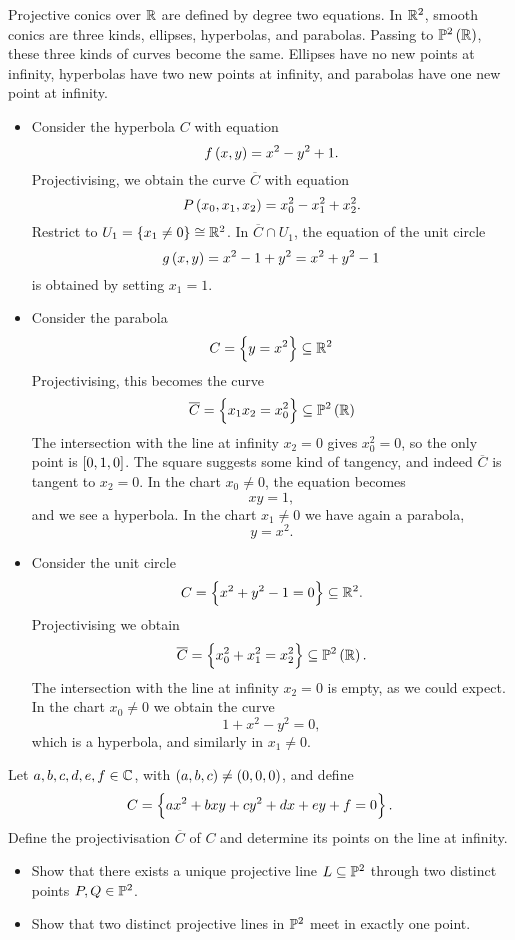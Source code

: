 \begin{example}
Projective conics over $ \mathbb{R} $ are defined by degree two equations. In $ \mathbb{R}^2 $, smooth conics are three kinds, ellipses, hyperbolas, and parabolas. Passing to $ \PP^2\br{\RR} $, these three kinds of curves become the same. Ellipses have no new points at infinity, hyperbolas have two new points at infinity, and parabolas have one new point at infinity.
\begin{itemize}
\item Consider the hyperbola $ C $ with equation
$$ f\br{x, y} = x^2 - y^2 + 1. $$
Projectivising, we obtain the curve $ \overline{C} $ with equation
$$ P\br{x_0, x_1, x_2} = x_0^2 - x_1^2 + x_2^2. $$
Restrict to $ U_1 = \cbr{x_1 \ne 0} \cong \RR^2 $. In $ \overline{C} \cap U_1 $, the equation of the unit circle
$$ g\br{x, y} = x^2 - 1 + y^2 = x^2 + y^2 - 1 $$
is obtained by setting $ x_1 = 1 $.
\item Consider the parabola
$$ C = \cbr{y = x^2} \subseteq \RR^2 $$
Projectivising, this becomes the curve
$$ \overline{C} = \cbr{x_1x_2 = x_0^2} \subseteq \PP^2\br{\RR} $$
The intersection with the line at infinity $ x_2 = 0 $ gives $ x_0^2 = 0 $, so the only point is $ \sbr{0, 1, 0} $. The square suggests some kind of tangency, and indeed $ \overline{C} $ is tangent to $ x_2 = 0 $. In the chart $ x_0 \ne 0 $, the equation becomes
$$ xy = 1, $$
and we see a hyperbola. In the chart $ x_1 \ne 0 $ we have again a parabola,
$$ y = x^2. $$
\item Consider the unit circle
$$ C = \cbr{x^2 + y^2 - 1 = 0} \subseteq \RR^2. $$
Projectivising we obtain
$$ \overline{C} = \cbr{x_0^2 + x_1^2 = x_2^2} \subseteq \PP^2\br{\RR}. $$
The intersection with the line at infinity $ x_2 = 0 $ is empty, as we could expect. In the chart $ x_0 \ne 0 $ we obtain the curve
$$ 1 + x^2 - y^2 = 0, $$
which is a hyperbola, and similarly in $ x_1 \ne 0 $.
\end{itemize}
\end{example}

\begin{exercise**}
Let $ a, b, c, d, e, f \in \mathbb{C} $, with $ \br{a, b, c} \ne \br{0, 0, 0} $, and define
$$ C = \cbr{ax^2 + bxy + cy^2 + dx + ey + f = 0}. $$
Define the projectivisation $ \overline{C} $ of $ C $ and determine its points on the line at infinity.
\end{exercise**}

\begin{exercise**}
\label{ex:18}
\hfill
\begin{itemize}
\item Show that there exists a unique projective line $ L \subseteq \mathbb{P}^2 $ through two distinct points $ P, Q \in \mathbb{P}^2 $.
\item Show that two distinct projective lines in $ \mathbb{P}^2 $ meet in exactly one point.
\end{itemize}
\end{exercise**}

